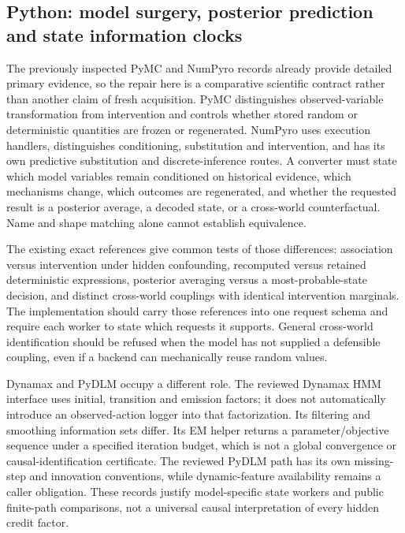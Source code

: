 \subsection{Python: model surgery, posterior prediction and state information clocks}

The previously inspected PyMC and NumPyro records already provide detailed primary evidence, so the repair here is a comparative scientific contract rather than another claim of fresh acquisition. PyMC distinguishes observed-variable transformation from intervention and controls whether stored random or deterministic quantities are frozen or regenerated. NumPyro uses execution handlers, distinguishes conditioning, substitution and intervention, and has its own predictive substitution and discrete-inference routes. A converter must state which model variables remain conditioned on historical evidence, which mechanisms change, which outcomes are regenerated, and whether the requested result is a posterior average, a decoded state, or a cross-world counterfactual. Name and shape matching alone cannot establish equivalence.~\citep{exec23_pymc_sources,exec23_numpyro_sources}

The existing exact references give common tests of those differences: association versus intervention under hidden confounding, recomputed versus retained deterministic expressions, posterior averaging versus a most-probable-state decision, and distinct cross-world couplings with identical intervention marginals. The implementation should carry those references into one request schema and require each worker to state which requests it supports. General cross-world identification should be refused when the model has not supplied a defensible coupling, even if a backend can mechanically reuse random values.~\citep{exec23_pymc_reference,exec23_numpyro_reference,exec25_bsw_choice}

Dynamax and PyDLM occupy a different role. The reviewed Dynamax HMM interface uses initial, transition and emission factors; it does not automatically introduce an observed-action logger into that factorization. Its filtering and smoothing information sets differ. Its EM helper returns a parameter/objective sequence under a specified iteration budget, which is not a global convergence or causal-identification certificate. The reviewed PyDLM path has its own missing-step and innovation conventions, while dynamic-feature availability remains a caller obligation. These records justify model-specific state workers and public finite-path comparisons, not a universal causal interpretation of every hidden credit factor.~\citep{exec19_dynamax_source,exec19_dynamax_reference,exec25_pydyn_pydlm,exec25_pydyn_choice}

